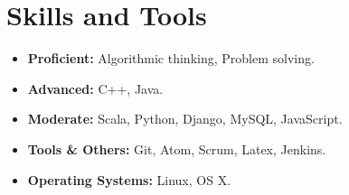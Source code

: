 \documentclass[a4paper,11pt]{article} %
\begin{document}

\section{Skills and Tools}
\begin{itemize}
 \item \textbf{Proficient:} Algorithmic thinking, Problem solving.
 \item \textbf{Advanced:} C++, Java.
 \item \textbf{Moderate:} Scala, Python, Django, MySQL, JavaScript.
 \item \textbf{Tools \& Others:} Git, Atom, Scrum, Latex, Jenkins.
 \item \textbf{Operating Systems:} Linux, OS X.
\end{itemize}


\end{document}

